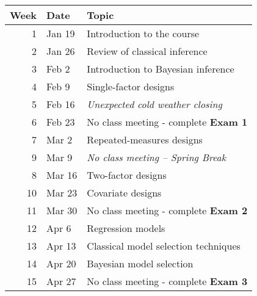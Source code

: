 \documentclass[10pt]{article}
\begin{document}
\begin{center}
\begin{tabular}{rll}
Week & Date & Topic\\
\hline
1 & Jan 19 & Introduction to the course\\
2 & Jan 26 & Review of classical inference\\
3 & Feb 2 & Introduction to Bayesian inference\\
4 & Feb 9 & Single-factor designs\\
5 & Feb 16 & \emph{Unexpected cold weather closing}\\
6 & Feb 23 & No class meeting - complete \textbf{Exam 1}\\
7 & Mar 2 & Repeated-measures designs\\
9 & Mar 9 & \emph{No class meeting -- Spring Break}\\
8 & Mar 16 & Two-factor designs\\
10 & Mar 23 & Covariate designs\\
11 & Mar 30 & No class meeting - complete \textbf{Exam 2}\\
12 & Apr 6 & Regression models\\
13 & Apr 13 & Classical model selection techniques\\
14 & Apr 20 & Bayesian model selection\\
15 & Apr 27 & No class meeting - complete \textbf{Exam 3}\\
\end{tabular}
\end{center}
\end{document}
